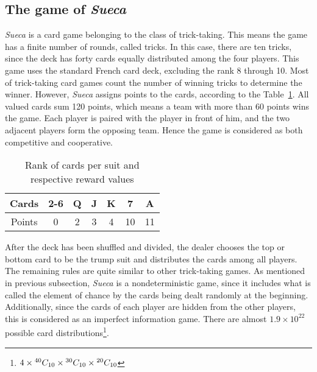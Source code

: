\subsection{The game of \emph{Sueca}}

\emph{Sueca} is a card game belonging to the class of trick-taking.
This means the game has a finite number of rounds, called tricks.
In this case, there are ten tricks, since the deck has forty cards equally distributed among the four players.
This game uses the standard French card deck, excluding the rank 8 through 10.
Most of trick-taking card games count the number of winning tricks to determine the winner.
However, \emph{Sueca} assigns points to the cards, according to the Table~\ref{tab:points-table}.
All valued cards sum 120 points, which means a team with more than 60 points wins the game.
Each player is paired with the player in front of him, and the two adjacent players form the opposing team.
Hence the game is considered as both competitive and cooperative.

\begin{table}[ht]
\centering
\begin{tabular}{|c|c|c|c|c|c|c|}
\hline
Cards  & 2-6 & Q & J & K & 7  & A  \\ \hline
Points & 0   & 2 & 3 & 4 & 10 & 11 \\ \hline
\end{tabular}
\caption{Rank of cards per suit and respective reward values}
\label{tab:points-table}
\end{table}

After the deck has been shuffled and divided, the dealer chooses the top or bottom card to be the trump suit and distributes the cards among all players.
The remaining rules are quite similar to other trick-taking games.
As mentioned in previous subsection, \emph{Sueca} is a nondeterministic game, since it includes what is called the element of chance by the cards being dealt randomly at the beginning.
Additionally, since the cards of each player are hidden from the other players, this is considered as an imperfect information game.
There are almost $1.9\times10^{22}$ possible card distributions\footnote{$4\times{}^{40}C_{10}\times{}^{30}C_{10}\times{}^{20}C_{10}$}.
